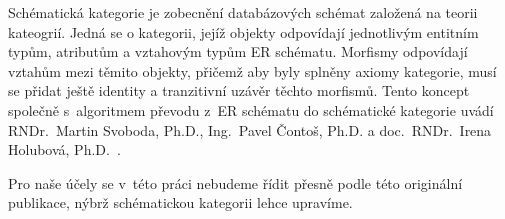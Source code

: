 Schématická kategorie je zobecnění databázových schémat založená na teorii kateogrií.
Jedná se o kategorii, jejíž objekty odpovídají jednotlivým entitním typům, atributům a vztahovým typům ER schématu.
Morfismy odpovídají vztahům mezi těmito objekty, přičemž aby byly splněny axiomy kategorie, musí se přidat ještě identity a tranzitivní uzávěr těchto morfismů.
Tento koncept společně s~algoritmem převodu z~ER schématu do schématické kategorie uvádí
RNDr.~Martin Svoboda, Ph.D.,
Ing.~Pavel Čontoš, Ph.D.
a
doc.~RNDr.~Irena Holubová, Ph.D.~\cite{svoboda_categorical_2021}.

Pro naše účely se v~této práci nebudeme řídit přesně podle této originální publikace, nýbrž schématickou kategorii lehce upravíme.
